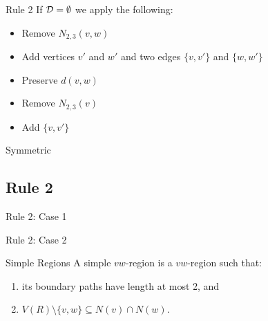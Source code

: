 \begin{frame}[c]{Rule 2}
    If $\mathbf{\mathcal{D} = \emptyset}$ we apply the following:

    \begin{caseof}

        \begin{itemize}
            \item Remove $N_{2,3}(v,w)$
            \item Add vertices $v'$ and $w'$ and two edges $\{v, v'\}$ and $\{w, w'\}$
            \item Preserve $d(v,w)$
        \end{itemize}
        \pause {}

        \begin{itemize}
            \item Remove $N_{2,3}(v)$
            \item Add $\{v, v'\}$
        \end{itemize}
        
        \pause {} Symmetric
    \end{caseof}
\end{frame}

\subsection{Rule 2}
\begin{frame}[2]{Rule 2: Case 1}
    \begin{figure}[!ht]
\end{figure}
\end{frame}

\begin{frame}[2]{Rule 2: Case 2}
    \begin{figure}[!ht]
\end{figure}
\end{frame}

\begin{frame}[c]{Simple Regions}
    A simple $vw$-region is a $vw$-region such that:
    \begin{enumerate}
        \item its boundary paths have length at most 2, and
        \item $V(R) \setminus \{v,w\} \subseteq N(v) \cap N(w)$.
    \end{enumerate}

    \pause\begin{figure}[!ht]
    \end{figure}

\end{frame}

